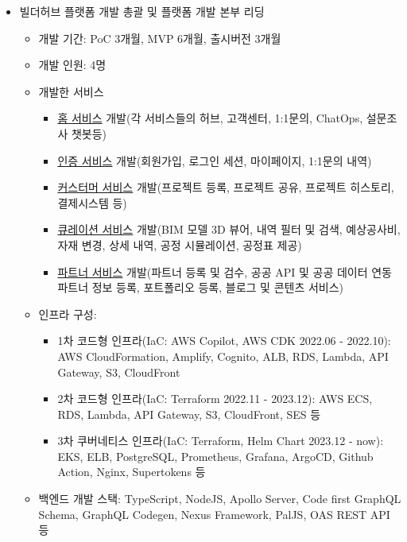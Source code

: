 \begin{itemize}
	\item 빌더허브 플랫폼 개발 총괄 및 플랫폼 개발 본부 리딩
	      \begin{itemize}[label=$\star$]
		      \item 개발 기간: PoC 3개월, MVP 6개월, 출시버전 3개월
		      \item 개발 인원: 4명
		      \item 개발한 서비스
		            \begin{itemize}
			            \item \href{https://builderhub.io}{홈 서비스} 개발(각 서비스들의 허브, 고객센터, 1:1문의, ChatOps, 설문조사 챗봇등)
			            \item \href{https://auth.builderhub.io}{인증 서비스} 개발(회원가입, 로그인 세션, 마이페이지, 1:1문의 내역)
			            \item \href{https://app.builderhub.io}{커스터머 서비스} 개발(프로젝트 등록, 프로젝트 공유, 프로젝트 히스토리, 결제시스템 등)
			            \item \href{https://curation.builderhub.io/project/tester}{큐레이션 서비스} 개발(BIM 모델 3D 뷰어, 내역 필터 및 검색, 예상공사비, 자재 변경, 상세 내역, 공정 시뮬레이션, 공정표 제공)
			            \item \href{https://partners.builderhub.io/}{파트너 서비스} 개발(파트너 등록 및 검수, 공공 API 및 공공 데이터 연동 파트너 정보 등록, 포트폴리오 등록, 블로그 및 콘텐츠 서비스)
		            \end{itemize}
		      \item 인프라 구성:
		            \begin{itemize}
									\item 1차 코드형 인프라(IaC: AWS Copilot, AWS CDK 2022.06 - 2022.10): AWS CloudFormation, Amplify, Cognito, ALB, RDS, Lambda, API Gateway, S3, CloudFront
									\item 2차 코드형 인프라(IaC: Terraform 2022.11 - 2023.12): AWS ECS, RDS, Lambda, API Gateway, S3, CloudFront, SES 등
									\item 3차 쿠버네티스 인프라(IaC: Terraform, Helm Chart 2023.12 - now): EKS, ELB, PostgreSQL, Prometheus, Grafana, ArgoCD, Github Action, Nginx, Supertokens 등
		            \end{itemize}
		      \item 백엔드 개발 스택: TypeScript, NodeJS, Apollo Server, Code first GraphQL Schema, GraphQL Codegen, Nexus Framework, PalJS, OAS REST API 등

\end{itemize}
\end{itemize}
